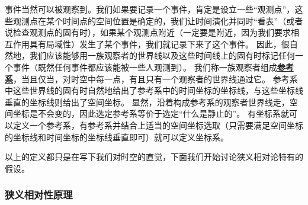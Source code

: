 \documentclass[hyperref, UTF8, a4paper]{ctexart}
\newcommand*{\concept}[1]{\underline{\textbf{#1}}}
\begin{document}
事件当然可以被观察到。我们如果要记录一个事件，肯定是设立一些“观测点”，这些观测点在某个时间点的空间位置是确定的，我们让时间演化并同时“看表”（或者说检查观测点的固有时），如果某个观测点附近（一定要是附近，因为我们要求相互作用具有局域性）发生了某个事件，我们就记录下来了这个事件。
因此，很自然地，我们应该能够用一族观察者的世界线以及这些时间线上的固有时标记任何一个事件（既然任何事件都应该能被一些人观测到）。
我们称一族观察者组成\concept{参考系}，当且仅当，对时空中每一点，有且只有一个观察者的世界线通过它。
参考系中这些世界线的固有时自然地给出了参考系中的时间坐标的坐标线，与这些坐标线垂直的坐标线则给出了空间坐标。
显然，沿着构成参考系的观察者世界线走，空间坐标是不会变的，因此选定参考系等价于选定“什么是静止的”。
有坐标系就可以定义一个参考系，有参考系并结合上适当的空间坐标选取（只需要满足空间坐标的坐标线和时间坐标的坐标线垂直即可）就可以定义坐标系。

以上的定义都只是在写下我们对时空的直觉，下面我们开始讨论狭义相对论特有的假设。

\subsubsection{狭义相对性原理}
\end{document}
